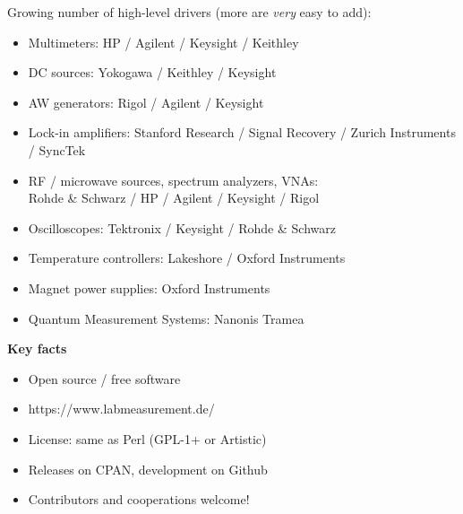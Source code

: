 \documentclass[portrait]{a0poster}
\newcommand{\lightblue}{\color{lightblue}}
\newcommand{\heading}[1]{
  {\color{heading}\boldmath\textbf{\huge #1}}\\[\medskipamount]
}
\begin{document}
{\begin{minipage}[t][\columnheighta-2\fboxsep-2\fboxrule][t]
\begin{minipage}{\textwidth}
\vspace*{1cm}
Growing number of high-level drivers (more are {\it very} easy to add):
{\large
\begin{itemize}
\item Multimeters: HP / Agilent / Keysight / Keithley
\item DC sources: Yokogawa / Keithley / Keysight
\item AW generators: Rigol / Agilent / Keysight
\item Lock-in amplifiers: Stanford Research / Signal Recovery / Zurich 
Instruments / SyncTek
\item RF / microwave sources, spectrum analyzers, VNAs: \\ Rohde \& Schwarz / 
HP / Agilent / Keysight / Rigol
\item Oscilloscopes: Tektronix / Keysight / Rohde \& Schwarz
\item Temperature controllers: Lakeshore / Oxford Instruments
\item Magnet power supplies: Oxford Instruments
\item Quantum Measurement Systems: Nanonis Tramea
\end{itemize}
}
\vspace*{1cm}
\heading{Key facts}
\vspace*{-2cm}
\begin{itemize}
 \item
 Open source / free software\\[-5cm]
 \item 
 {\lightblue https://www.labmeasurement.de/}
 \hfill{}
 \item
 License: same as Perl (GPL-1+ or Artistic)
 \item
 Releases on CPAN, development on Github
 \item
 Contributors and cooperations welcome!
\end{itemize}

%
%
%
\end{minipage}
\end{minipage}}
%
%
\end{document}

